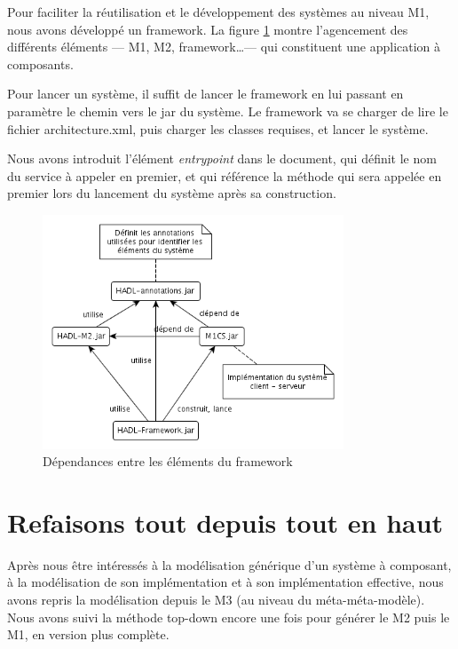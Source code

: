 \documentclass[french,a4paper,titlepage]{article}
\begin{document}
		Pour faciliter la réutilisation et le développement des systèmes au niveau
		M1, nous avons développé un framework. La figure \ref{fig:framework} montre
		l'agencement des différents éléments --- M1, M2, framework\dots --- qui
		constituent une application à composants.
		
		Pour lancer un système, il suffit de lancer le framework en lui passant en
		paramètre le chemin vers le jar du système. Le framework va se charger de
		lire le fichier architecture.xml, puis charger les classes requises, et
		lancer le système.
		
		Nous avons introduit l'élément \emph{entrypoint} dans le document, qui
		définit le nom du service à appeler en premier, et qui référence la méthode
		qui sera appelée en premier lors du lancement du système après sa
		construction.
		
		\begin{figure}[htb]
			\centering
			\includegraphics[width=0.8\textwidth]{./framework.png}
			\caption{Dépendances entre les éléments du framework}
			\label{fig:framework}
		\end{figure}
	
	
	\section{Refaisons tout depuis tout en haut}
	
		Après nous être intéressés à la modélisation générique d'un système à
		composant, à la modélisation de son implémentation et à son implémentation
		effective, nous avons repris la modélisation depuis le M3 (au niveau du
		méta-méta-modèle). Nous avons suivi la méthode top-down encore une fois pour
		générer le M2 puis le M1, en version plus complète.
		
\end{document}
